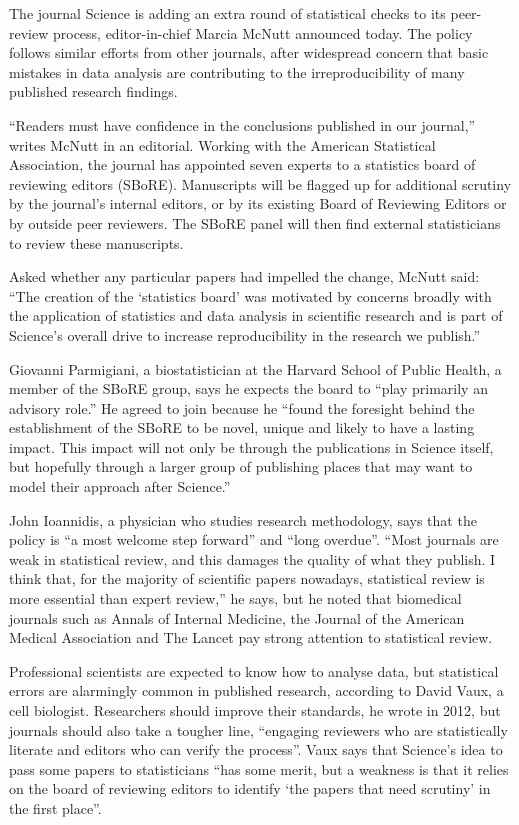 The journal Science is adding an extra round of statistical checks to its peer-review process, editor-in-chief Marcia McNutt announced today. The policy follows similar efforts from other journals, after widespread concern that basic mistakes in data analysis are contributing to the irreproducibility of many published research findings.


``Readers must have confidence in the conclusions published in our journal,'' writes McNutt in an editorial. Working with the American Statistical Association, the journal has appointed seven experts to a statistics board of reviewing editors (SBoRE). Manuscripts will be flagged up for additional scrutiny by the journal's internal editors, or by its existing Board of Reviewing Editors or by outside peer reviewers. The SBoRE panel will then find external statisticians to review these manuscripts.


Asked whether any particular papers had impelled the change, McNutt said: ``The creation of the `statistics board' was motivated by concerns broadly with the application of statistics and data analysis in scientific research and is part of Science's overall drive to increase reproducibility in the research we publish.''


Giovanni Parmigiani, a biostatistician at the Harvard School of Public Health,  a member of the SBoRE group, says he expects the board to ``play primarily an advisory role.'' He agreed to join because he ``found the foresight behind the establishment of the SBoRE to be novel, unique and likely to have a lasting impact. This impact will not only be through the publications in Science itself, but hopefully through a larger group of publishing places that may want to model their approach after Science.''


John Ioannidis, a physician who studies research methodology, says that the policy is ``a most welcome step forward'' and ``long overdue''. ``Most journals are weak in statistical review, and this damages the quality of what they publish. I think that, for the majority of scientific papers nowadays, statistical review is more essential than expert review,'' he says, but he noted that biomedical journals such as Annals of Internal Medicine, the Journal of the American Medical Association and The Lancet pay strong attention to statistical review.


Professional scientists are expected to know how to analyse data, but statistical errors are alarmingly common in published research, according to David Vaux, a cell biologist. Researchers should improve their standards, he wrote in 2012, but journals should also take a tougher line, ``engaging reviewers who are statistically literate and editors who can verify the process''. Vaux says that Science's idea to pass some papers to statisticians ``has some merit, but a weakness is that it relies on the board of reviewing editors to identify `the papers that need scrutiny' in the first place''.